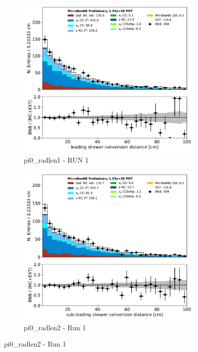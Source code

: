 \documentclass[a4paper]{article}
\begin{document}
\begin{figure}[H] 
\begin{center}
    \begin{subfigure}[b]{0.3\textwidth}
    \centering
    \includegraphics[width=1.00\textwidth]{pi0/pi0_radlen1_01152020_inputs_RUN1.pdf}
    \caption{\label{fig:pi0:inputs:radlen1:RUN3} pi0\_radlen1 - RUN 1 }
    \end{subfigure}
    \begin{subfigure}[b]{0.3\textwidth}
    \centering
    \includegraphics[width=1.00\textwidth]{pi0/pi0_radlen2_01152020_inputs_RUN1.pdf}
    \caption{\label{fig:pi0:inputs:radlen2:RUN3} pi0\_radlen2 - Run 1 }
    \end{subfigure}
\end{center}
\end{figure}
\end{document}
